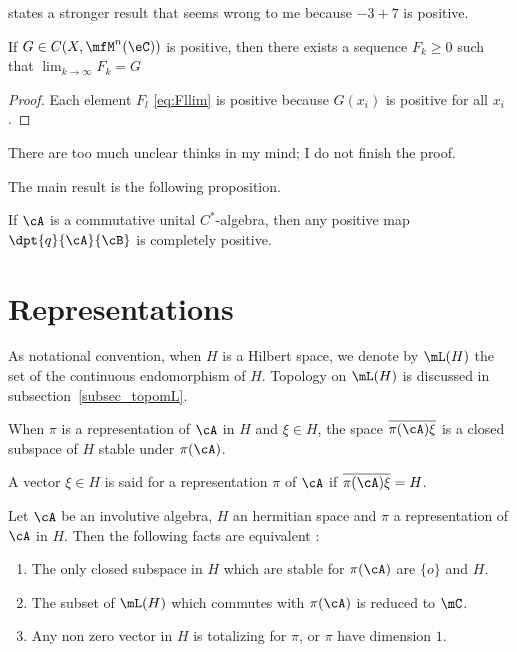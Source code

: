 \begin{probleme}
	\cite{Landsman} states a stronger result that seems wrong to me because \( -3+7\) is positive.
\end{probleme}

\begin{proposition}
	If $G\in C(X,\mfM^n(\eC))$ is positive, then there exists a sequence $F_k\geq 0$ such that $\lim_{k\to\infty}F_k=G$
\end{proposition}

\begin{proof}
	Each element $F_l$ \eqref{eq:Fllim} is positive because  $G(x_i)$ is positive for all $x_i$.
\end{proof}

\begin{probleme}
	There are too much unclear thinks in my mind; I do not finish the proof.
\end{probleme}

The main result is the following proposition.

\begin{proposition}
	If $\cA$ is a commutative unital $C^*$-algebra, then any positive map $\dpt{ q }{ \cA }{ \cB }$ is completely positive.
\end{proposition}


\section{Representations}

As notational convention, when $H$ is a Hilbert space, we denote by $\mL(H)$ the set of the continuous endomorphism of $H$. Topology on $\mL(H)$ is discussed in subsection~\ref{subsec_topomL}.

When $\pi$ is a representation of $\cA$ in $H$ and $\xi\in H$, the space $\overline{ \pi(\cA)\xi }$ is a closed subspace of $H$ stable under $\pi(\cA)$.

\begin{definition}
	A vector $\xi\in H$ is said  for a
	representation $\pi$ of $\cA$ if $\overline{ \pi(\cA)\xi }=H$.
\end{definition}

\begin{proposition}
	Let $\cA$ be an involutive algebra, $H$ an hermitian space and $\pi$ a representation of $\cA$ in $H$. Then the following facts are equivalent
	:
	\begin{enumerate}
		\item The only closed subspace in $H$ which are stable for $\pi(\cA)$
		      are $\{o\}$ and $H$.
		\item The subset of $\mL(H)$ which commutes with $\pi(\cA)$ is reduced
		      to $\mC$.
		\item Any non zero vector in $H$ is totalizing for $\pi$, or $\pi$ have
		      dimension $1$.
	\end{enumerate}
	\label{prop:reprez_topo}
\end{proposition}


